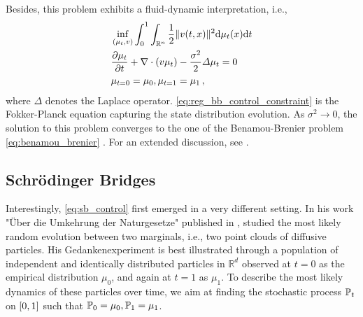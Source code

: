 Besides, this problem exhibits a fluid-dynamic interpretation, i.e.,
\begin{align}
	& \inf _{(\mu_t, v)} \int_0^1 \int_{\mathbb{R}^n}\frac{1}{2}\lVert v(t, x)\rVert^2 \mathrm{d}\mu_t(x) \mathrm{d} t \\
	\label{eq:reg_bb_control_constraint} & \frac{\partial \mu_t}{\partial t}+\nabla \cdot(v \mu_t) - \frac{\sigma^2}{2} \Delta \mu_t = 0 \\
	& \nonumber \mu_{t=0}=\mu_0, \mu_{t=1}=\mu_1\,,
\end{align}
where $\Delta$ denotes the Laplace operator.
\eqref{eq:reg_bb_control_constraint} is the Fokker-Planck equation capturing the state distribution evolution.
As $\sigma^2 \rightarrow 0$, the solution to this problem converges to the one of the Benamou-Brenier problem \eqref{eq:benamou_brenier} \citep{mikami2008optimal}.
For an extended discussion, see \citet{dai1991stochastic, mikami2000dynamical, mikami2002optimal}.


\subsection{Schr{\"o}dinger Bridges} \label{sec:background_sb}

Interestingly, \cref{eq:sb_control} first emerged in a very different setting.
In his work "{\"U}ber die Umkehrung der Naturgesetze" published in \citeyear{schrodinger1931umkehrung}, \citeauthor{schrodinger1931umkehrung} studied the most likely random evolution between two marginals, i.e., two point clouds of diffusive particles.
His Gedankenexperiment is best illustrated through a population of independent and identically distributed particles in $\mathbb{R}^d$ observed at $t=0$ as the empirical distribution $\mu_0$, and again at $t=1$ as $\mu_1$.
To describe the most likely dynamics of these particles over time, we aim at finding the stochastic process $\mathbb{P}_{{t}}$ on $[0,1]$ such that $\mathbb{P}_{{0}} = \mu_0, \mathbb{P}_{{1}} = \mu_1$.

